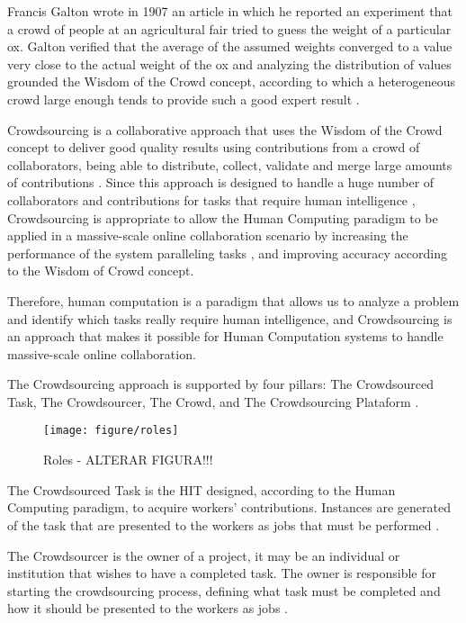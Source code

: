 

Francis Galton wrote in 1907 an article in which he reported an experiment that a crowd of people at an agricultural fair tried to guess the weight of a particular ox. Galton verified that the average of the assumed weights converged to a value very close to the actual weight of the ox and analyzing the distribution of values grounded the Wisdom of the Crowd concept, according to which a heterogeneous crowd large enough tends to provide such a good expert result \cite{GALTON1907}.
 
 
Crowdsourcing is a collaborative approach that uses the Wisdom of the Crowd concept to deliver good quality results using contributions from a crowd of collaborators, being able to distribute, collect, validate and merge large amounts of contributions \cite{Hong:2011:GCR:2018966.2018970,Haas:2015:AMC:2824032.2824062,Mo:2013:OPH:2505515.2505755}. Since this approach is designed to handle a huge number of collaborators and contributions for tasks that require human intelligence \cite{Howe2006}, Crowdsourcing is appropriate to allow the Human Computing paradigm to be applied in a massive-scale online collaboration \cite{TEDMassive} scenario by increasing the performance of the system paralleling tasks \cite{Rohwer:2010:NHC:1837885.1837897}, and improving accuracy according to the Wisdom of Crowd concept.
 
Therefore, human computation is a paradigm that allows us to analyze a problem and identify which tasks really require human intelligence, and Crowdsourcing is an approach that makes it possible for Human Computation systems to handle massive-scale online collaboration. 

The Crowdsourcing approach is supported by four pillars:  The Crowdsourced Task, The Crowdsourcer, The Crowd, and The Crowdsourcing Plataform \cite{6861072}.

\begin{figure}[!htb]
\centering
\texttt{[image: figure/roles]}
\caption{Roles - ALTERAR FIGURA!!!}
\label{Roles}
\end{figure}

The Crowdsourced Task is the HIT designed, according to the Human Computing paradigm, to acquire workers' contributions. Instances are generated of the task that are presented to the workers as jobs that must be performed \cite{Difallah:2015:DMC:2736277.2741685}.

The Crowdsourcer is the owner of a project, it may be an individual or institution that wishes to have a completed task. The owner is responsible for starting the crowdsourcing process, defining what task must be completed and how it should be presented to the workers as jobs \cite{6861072}.

